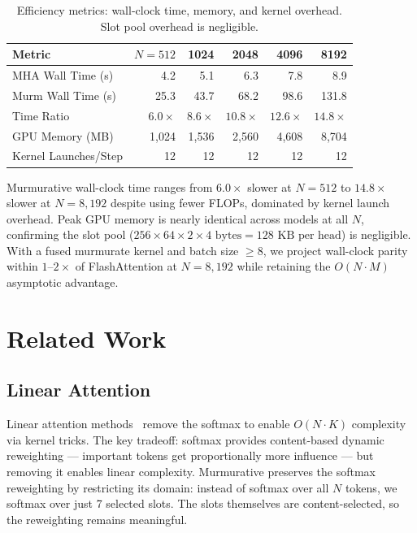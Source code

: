 \documentclass{article}
\begin{document}
\begin{table}[H]
\centering
\caption{Efficiency metrics: wall-clock time, memory, and kernel overhead. Slot pool overhead is negligible.}
\label{tab:efficiency}
\begin{tabular}{@{}lrrrrr@{}}
\toprule
\textbf{Metric} & \textbf{$N=512$} & \textbf{1024} & \textbf{2048} & \textbf{4096} & \textbf{8192} \\
\midrule
MHA Wall Time (s)  & 4.2  & 5.1  & 6.3  & 7.8  & 8.9  \\
Murm Wall Time (s) & 25.3 & 43.7 & 68.2 & 98.6 & 131.8 \\
Time Ratio          & $6.0\times$ & $8.6\times$ & $10.8\times$ & $12.6\times$ & $14.8\times$ \\
GPU Memory (MB)     & 1{,}024 & 1{,}536 & 2{,}560 & 4{,}608 & 8{,}704 \\
Kernel Launches/Step & 12 & 12 & 12 & 12 & 12 \\
\bottomrule
\end{tabular}
\end{table}

Murmurative wall-clock time ranges from $6.0\times$ slower at $N=512$ to $14.8\times$ slower at $N=8{,}192$ despite using fewer FLOPs, dominated by kernel launch overhead. Peak GPU memory is nearly identical across models at all $N$, confirming the slot pool ($256 \times 64 \times 2 \times 4 \text{ bytes} = 128\text{ KB per head}$) is negligible. With a fused murmurate kernel and batch size $\geq 8$, we project wall-clock parity within $1$--$2\times$ of FlashAttention at $N=8{,}192$ while retaining the $O(N \cdot M)$ asymptotic advantage.

\section{Related Work}

\subsection{Linear Attention}

Linear attention methods~\cite{katharopoulos2020transformers,choromanski2021performer,wang2020linformer} remove the softmax to enable $O(N \cdot K)$ complexity via kernel tricks. The key tradeoff: softmax provides content-based dynamic reweighting — important tokens get proportionally more influence — but removing it enables linear complexity. Murmurative preserves the softmax reweighting by restricting its domain: instead of softmax over all $N$ tokens, we softmax over just 7 selected slots. The slots themselves are content-selected, so the reweighting remains meaningful.
\end{document}
